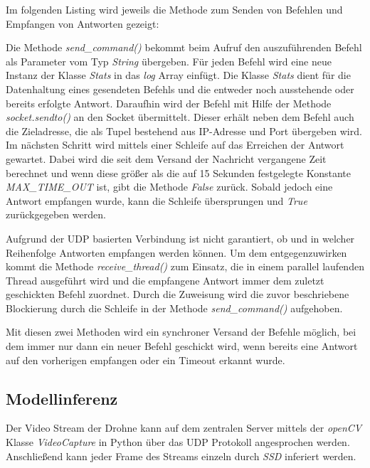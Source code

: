 Im folgenden Listing wird jeweils die Methode zum Senden von Befehlen und Empfangen von Antworten gezeigt:



Die Methode \textit{send\_command()} bekommt beim Aufruf den auszuführenden Befehl als Parameter vom Typ \textit{String} übergeben. Für jeden Befehl wird eine neue Instanz der Klasse \textit{Stats} in das \textit{log} Array einfügt. Die Klasse \textit{Stats} dient für die Datenhaltung eines gesendeten Befehls und die entweder noch ausstehende oder bereits erfolgte Antwort. Daraufhin wird der Befehl mit Hilfe der Methode \textit{socket.sendto()} an den Socket übermittelt. Dieser erhält neben dem Befehl auch die Zieladresse, die als Tupel bestehend aus IP-Adresse und Port übergeben wird. Im nächsten Schritt wird mittels einer Schleife auf das Erreichen der Antwort gewartet. Dabei wird die seit dem Versand der Nachricht vergangene Zeit berechnet und wenn diese größer als die auf 15 Sekunden festgelegte Konstante \textit{MAX\_TIME\_OUT} ist, gibt die Methode \textit{False} zurück. Sobald jedoch eine Antwort empfangen wurde, kann die Schleife übersprungen und \textit{True} zurückgegeben werden.

Aufgrund der UDP basierten Verbindung ist nicht garantiert, ob und in welcher Reihenfolge Antworten empfangen werden können. Um dem entgegenzuwirken kommt die Methode \textit{receive\_thread()} zum Einsatz, die in einem parallel laufenden Thread ausgeführt wird und die empfangene Antwort immer dem zuletzt geschickten Befehl zuordnet. Durch die Zuweisung wird die zuvor beschriebene Blockierung durch die Schleife in der Methode \textit{send\_command()} aufgehoben. 

Mit diesen zwei Methoden wird ein synchroner Versand der Befehle möglich, bei dem immer nur dann ein neuer Befehl geschickt wird, wenn bereits eine Antwort auf den vorherigen empfangen oder ein Timeout erkannt wurde.

\subsection*{Modellinferenz}

Der Video Stream der Drohne kann auf dem zentralen Server mittels der \textit{openCV} Klasse \textit{VideoCapture} in Python über das UDP Protokoll angesprochen werden. Anschließend kann jeder Frame des Streams einzeln durch \textit{SSD} inferiert werden.

